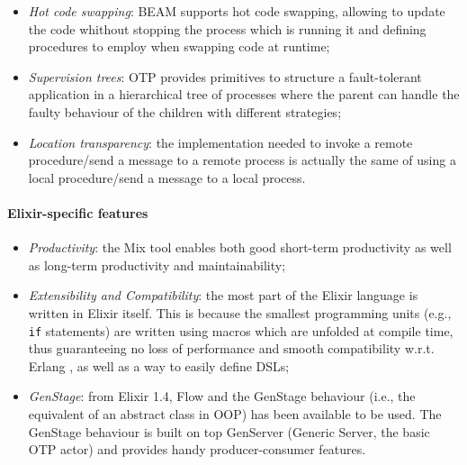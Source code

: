 \begin{itemize}
    \item \textit{Hot code swapping}: BEAM supports hot code swapping, allowing
        to update the code whithout stopping the process which is running it
        and defining procedures to employ when swapping code at runtime;
    \item \textit{Supervision trees}: OTP provides primitives to structure a
        fault-tolerant application in a hierarchical tree of processes where
        the parent can handle the faulty behaviour of the children with
        different strategies;
    \item \textit{Location transparency}: the implementation needed to invoke a
        remote procedure/send a message to a remote process is actually the same
        of using a local procedure/send a message to a local process.
\end{itemize}

\paragraph{Elixir-specific features}
\begin{itemize}
  \item \textit{Productivity}: the Mix tool enables both good short-term
        productivity as well as long-term productivity and maintainability;
  \item \textit{Extensibility and Compatibility}: the most part of the Elixir
        language is written in Elixir itself. This is because the smallest
        programming units (e.g., \texttt{if} statements) are written using
        macros which are unfolded at compile time, thus guaranteeing no loss of
        performance and smooth compatibility w.r.t. Erlang , as well as a way
        to easily define DSLs;
  \item \textit{GenStage}: from Elixir 1.4, Flow and the GenStage behaviour
        (i.e., the equivalent of an abstract class in OOP) has been available
        to be used. The GenStage behaviour is built on top GenServer (Generic
        Server, the basic OTP actor) and provides handy producer-consumer
        features.
\end{itemize}
